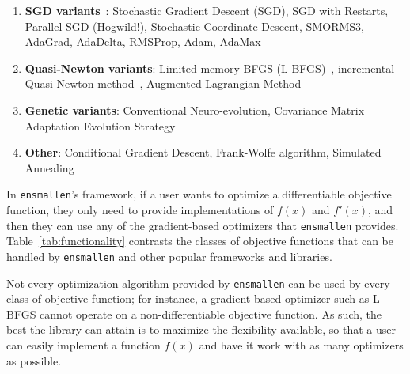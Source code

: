 \documentclass{article}
\begin{document}
\vspace*{-0.4em}
\begin{enumerate}[{~~~$\bullet$}]
\small
  \item {\bf SGD variants}~\cite{Robbins_1951,kingma2015adam}:
      Stochastic Gradient Descent (SGD),
      SGD with Restarts,
      Parallel SGD (Hogwild!),
      Stochastic Coordinate Descent, 
      SMORMS3, AdaGrad,
      AdaDelta, RMSProp, Adam, AdaMax

  \item {\bf Quasi-Newton variants}:
      Limited-memory BFGS (L-BFGS)~\cite{zhu1997algorithm},
      incremental Quasi-Newton method~\cite{Mokhtari_2018},
      Augmented Lagrangian Method~\cite{Hestenes_1969}

  \item {\bf Genetic variants}:
        Conventional Neuro-evolution,
        Covariance Matrix Adaptation Evolution Strategy

  \item {\bf Other}: Conditional Gradient Descent, Frank-Wolfe algorithm, Simulated Annealing~\cite{kirkpatrick1983optimization}

\end{enumerate}

In {\tt ensmallen}'s framework, if a user wants to optimize a differentiable objective
function, they only need to provide implementations of $f(x)$ and $f'(x)$, and
then they can use any of the gradient-based optimizers that {\tt ensmallen}
provides.  Table~\ref{tab:functionality} contrasts 
the classes of objective functions that can be handled by {\tt ensmallen}
and other popular frameworks and libraries.

Not every optimization algorithm provided by {\tt ensmallen} can be
used by every class of objective function; for instance, a gradient-based
optimizer such as L-BFGS cannot operate on a non-differentiable objective
function.
As such, the best the library can attain is to maximize the flexibility
available, so that a user can easily implement a function $f(x)$ and have it
work with as many optimizers as possible.
\end{document}
